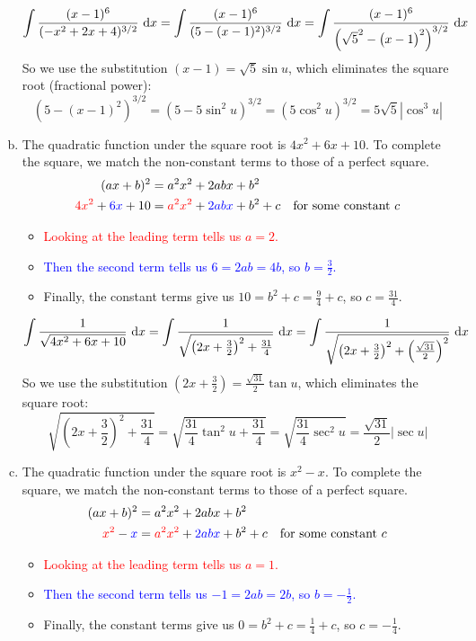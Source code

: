\begin{solution}
\begin{enumerate}[(a)]
\[\displaystyle\int \dfrac{(x-1)^6}{(-x^2+2x+4)^{3/2}}~\dee{x}=\displaystyle\int \dfrac{(x-1)^6}{(5-(x-1)^2)^{3/2}}~\dee{x}=\displaystyle\int \dfrac{(x-1)^6}{\left(\sqrt{5}^2-\left(x-1\vphantom{\sqrt{3}}\right)^2\right)^{3/2}}~\dee{x}\]
So we use the substitution $(x-1) = \sqrt{5}\sin u$, which eliminates the square root (fractional power):
\[(5-\left(x-1\right)^2)^{3/2}=\left(5-5\sin^2u\right)^{3/2} = \left(5\cos^2 u\right)^{3/2} = 5\sqrt{5}|\cos^3 u|\]
%
\item 
The quadratic function under the square root is $4x^2+6x+10$. To complete the square, we match the non-constant terms to those of a perfect square.
\begin{align*}
(ax+b)^2&=a^2x^2+2abx+b^2\\
\textcolor{red}{4x^2}+\textcolor{blue}{6x}+10&=\textcolor{red}{a^2x^2} + \textcolor{blue}{2abx} +b^2 + c \quad\mbox{for some constant $c$}
\end{align*}
\begin{itemize}
\item \textcolor{red}{Looking at the leading term tells us $a=2$. }
\item \textcolor{blue}{Then the second term tells us $6=2ab=4b$, so $b=\frac{3}{2}$.}
\item Finally, the constant terms give us $10=b^2+c=\frac{9}{4}+c$, so $c=\frac{31}{4}$.
\end{itemize}
\[\displaystyle\int \dfrac{1}{\sqrt{4x^2+6x+10}}~\mathrm{d}x=\displaystyle\int \dfrac{1}{\sqrt{\left(2x+\frac{3}{2}\right)^2+\frac{31}{4}}}~\mathrm{d}x
=\displaystyle\int \dfrac{1}{\sqrt{\left(2x+\frac{3}{2}\right)^2+\left(\frac{\sqrt{31}}{2}\right)^2}}~\mathrm{d}x\]
So we use the substitution $\left(2x+\frac{3}{2}\right) =\frac{\sqrt{31}}{2}\tan u$, which eliminates the square root:
\[\sqrt{\left(2x+\frac{3}{2}\right)^2+\frac{31}{4}}=\sqrt{\frac{31}{4}\tan^2 u +\frac{31}{4}} = \sqrt{\frac{31}{4}\sec^2 u} =\frac{\sqrt{31}}{2}|\sec u|\]
%
\item 
The quadratic function under the square root is $x^2-x$. To complete the square, we match the non-constant terms to those of a perfect square.
\begin{align*}
(ax+b)^2&=a^2x^2+2abx+b^2\\
\textcolor{red}{x^2}-\textcolor{blue}{x}&=\textcolor{red}{a^2x^2} + \textcolor{blue}{2abx} +b^2 + c \quad\mbox{for some constant $c$}
\end{align*}
\begin{itemize}
\item \textcolor{red}{Looking at the leading term tells us $a=1$. }
\item \textcolor{blue}{Then the second term tells us $-1=2ab=2b$, so $b=-\frac{1}{2}$.}
\item Finally, the constant terms give us $0=b^2+c=\frac{1}{4}+c$, so $c=-\frac{1}{4}$.
\end{itemize}



\end{enumerate}
\end{solution}
